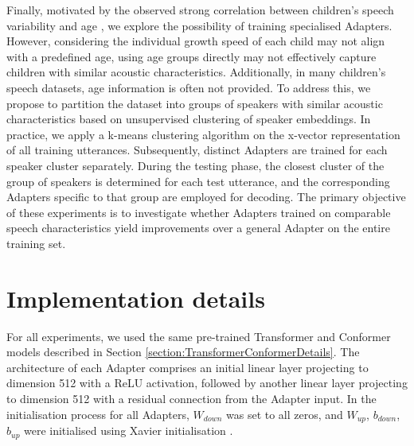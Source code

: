 
Finally, motivated by the observed strong correlation between children's speech variability and age \cite{TFchildren}, we explore the possibility of training specialised Adapters. However, considering the individual growth speed of each child may not align with a predefined age, using age groups directly may not effectively capture children with similar acoustic characteristics. Additionally, in many children's speech datasets, age information is often not provided. To address this, we propose to partition the dataset into groups of speakers with similar acoustic characteristics based on unsupervised clustering of speaker embeddings.
In practice, we apply a k-means clustering algorithm on the x-vector representation \cite{snyder2018x} of all training utterances. Subsequently, distinct Adapters are trained for each speaker cluster separately. During the testing phase, the closest cluster of the group of speakers is determined for each test utterance, and the corresponding Adapters specific to that group are employed for decoding.
The primary objective of these experiments is to investigate whether Adapters trained on comparable speech characteristics yield improvements over a general Adapter on the entire training set. %

\section{Implementation details}

For all experiments, we used the same pre-trained Transformer and Conformer models described in Section \ref{section:TransformerConformerDetails}. The architecture of each Adapter comprises an initial linear layer projecting to dimension 512 with a \ac{ReLU} activation, followed by another linear layer projecting to dimension 512 with a residual connection from the Adapter input. In the initialisation process for all Adapters, $W_{down}$ was set to all zeros, and $W_{up}$, $b_{down}$, $b_{up}$ were initialised using Xavier initialisation \cite{glorot2010understanding}.

